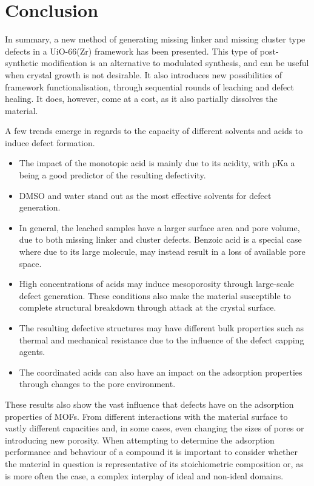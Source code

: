 
\FloatBarrier%
\pagebreak

\section{Conclusion}

In summary, a new method of generating missing linker and missing
cluster type defects in a UiO-66(Zr) framework has been presented.
This type of post-synthetic modification is an alternative to 
modulated synthesis, and can be useful when crystal growth is
not desirable. It also introduces new possibilities of framework
functionalisation, through sequential rounds of leaching and 
defect healing. It does, however, come at a cost, as it also 
partially dissolves the material.

A few trends emerge in regards to the capacity of different solvents 
and acids to induce defect formation.

\begin{itemize}
    \item The impact of the monotopic acid is mainly due to its 
    acidity, with pKa a being a good predictor of the 
    resulting defectivity.
    \item \gls{DMSO} and water stand out as the most effective solvents
    for defect generation.
    \item In general, the leached samples have a larger surface 
    area and pore volume, due to both missing linker and cluster
    defects. Benzoic acid is a special case where 
    due to its large molecule, may instead result in a loss of
    available pore space.
    \item High concentrations of acids may induce mesoporosity
    through large-scale defect generation. These conditions also
    make the material susceptible to complete 
    structural breakdown through attack at the crystal surface.
    \item The resulting defective structures may have different 
    bulk properties such as thermal and mechanical resistance due 
    to the influence of the defect capping agents.
    \item The coordinated acids can also have an impact on the
    adsorption properties through changes to the pore environment.

\end{itemize}

These results also show the vast influence that defects have on the 
adsorption properties of \glspl{MOF}. From different interactions with 
the material surface to vastly different capacities and, in some 
cases, even changing the sizes of pores or introducing new porosity.
When attempting to determine the adsorption performance and behaviour
of a compound it is important to consider whether the material in 
question is representative of its stoichiometric composition or,
as is more often the case, a complex interplay of ideal and 
non-ideal domains.

\pagebreak